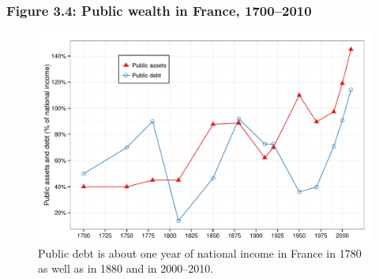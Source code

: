 \documentclass[t]{beamer}\usepackage[]{graphicx}\usepackage[]{color}
\newenvironment{knitrout}{}{} %
\begin{document}
\begin{frame}[label=Figure_3_4]
\frametitle{Figure 3.4: Public wealth in France, 1700--2010}
\begin{figure}[t]
\begin{minipage}[b]{\textwidth}
\centering
\begin{knitrout}\footnotesize
{}\color{fgcolor}

{\centering \includegraphics[width=1\linewidth]{figures/color/Figure_3_4} 

}



\end{knitrout}
\caption{Public debt is about one year of national income in France in 1780 as well as in 1880 and in 2000--2010.}
\end{minipage}
\end{figure}
\end{frame}
\end{document}
